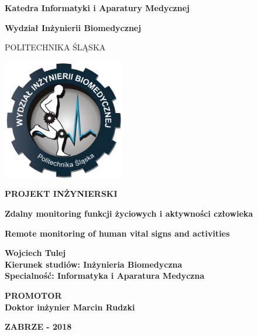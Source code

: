 \documentclass[12pt,a4paper]{report}
\begin{document}
\begin{titlepage}
\begin{center}     
    \Large
    \textbf{Katedra Informatyki i Aparatury Medycznej}    
\end{center}
\begin{center}     
    \Large
    \textbf{Wydział Inżynierii Biomedycznej}    
\end{center}
\begin{center}     
    \Large
    POLITECHNIKA ŚLĄSKA      
\end{center}
\begin{center}
	\includegraphics[width=0.4\textwidth]{Images/logo_ib}
\end{center}
\begin{center}     
    \Large
    \textbf{PROJEKT INŻYNIERSKI}    
\end{center}
\vspace{0.3cm}
\begin{center}
	\large     
    \textbf{Zdalny monitoring funkcji życiowych i aktywności człowieka}    
\end{center}
\begin{center}
	\large     
    \textbf{Remote monitoring of human vital signs and activities}    
\end{center}
\vspace{1cm}
\begin{center}
	\large
	\textbf{Wojciech Tulej}\\
	\textbf{Kierunek studiów: Inżynieria Biomedyczna}\\
	\textbf{Specialność: Informatyka i Aparatura Medyczna}
\end{center}
\vspace{1cm}
\begin{center}
	\large
	\textbf{PROMOTOR}\\
	\textbf{Doktor inżynier Marcin Rudzki}
\end{center}
\vspace{1cm}
\begin{center}
	\large
	\textbf{ZABRZE - 2018}
\end{center}
\end{titlepage}
\end{document}
